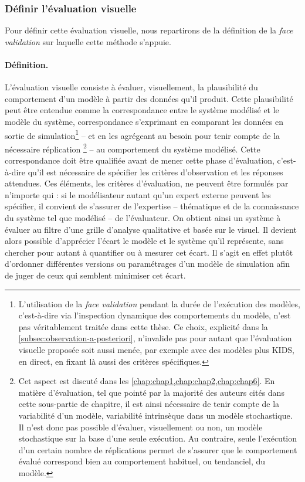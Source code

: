 \subsubsection{Définir l'évaluation visuelle} Pour définir cette évaluation visuelle, nous repartirons de la définition de la \textit{face validation} sur laquelle cette méthode s'appuie.

\paragraph{Définition.} L'évaluation visuelle consiste à évaluer, visuellement, la plausibilité du comportement d'un modèle à partir des données qu'il produit.
Cette plausibilité peut être entendue comme la correspondance entre le système modélisé et le modèle du système, correspondance s'exprimant en comparant les données en sortie de simulation\footnote{
	L'utilisation de la \textit{face validation} pendant la durée de l'exécution des modèles, c'est-à-dire via l'inspection dynamique des comportements du modèle, n'est pas véritablement traitée dans cette thèse.
	Ce choix, explicité dans la \cref{subsec:observation-a-posteriori}, n'invalide pas pour autant que l'évaluation visuelle proposée soit aussi menée, par exemple avec des modèles plus KIDS, \og en direct\fg{}, en fixant là aussi des critères spécifiques.
} -- et en les agrégeant au besoin pour tenir compte de la nécessaire réplication
\footnote{
	Cet aspect est discuté dans les \cref{chap:chap1,chap:chap2,chap:chap6}.
	En matière d'évaluation, tel que pointé par la majorité des auteurs cités dans cette sous-partie de chapitre, il est ainsi nécessaire de tenir compte de la variabilité d'un modèle, variabilité intrinsèque dans un modèle stochastique.
	Il n'est donc pas possible d'évaluer, visuellement ou non, un modèle stochastique sur la base d'une seule exécution. Au contraire, seule l'exécution d'un certain nombre de réplications permet de s'assurer que le comportement évalué correspond bien au comportement habituel, ou tendanciel, du modèle.
} -- au comportement du système modélisé.
Cette correspondance doit être qualifiée avant de mener cette phase d'évaluation, c'est-à-dire qu'il est nécessaire de spécifier les critères d'observation et les réponses attendues.
Ces éléments, les critères d'évaluation, ne peuvent être formulés par n'importe qui : si le modélisateur autant qu'un expert externe peuvent les spécifier, il convient de s'assurer de l'expertise -- thématique et de la connaissance du système tel que modélisé -- de l'évaluateur.
On obtient ainsi un système à évaluer au filtre d'une grille d'analyse qualitative et basée sur le visuel.
Il devient alors possible d'apprécier l'écart le modèle et le système qu'il représente, sans chercher pour autant à quantifier ou à mesurer cet écart. 
Il s'agit en effet plutôt d'ordonner différentes versions ou paramétrages d'un modèle de simulation afin de juger de ceux qui semblent minimiser cet écart.

